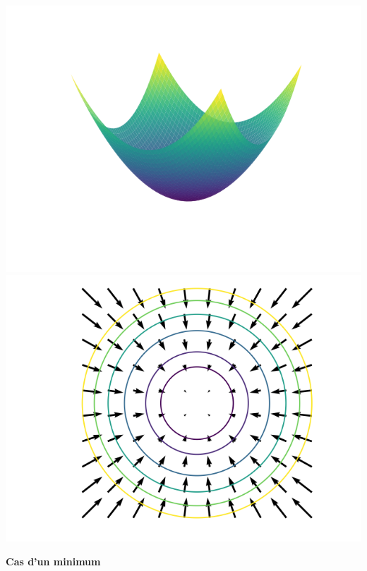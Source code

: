 \begin{center}
	\begin{minipage}{0.30\textwidth}
		\center
		\ \ \includegraphics[scale=\myscale,scale=0.35]{figures/gradient-surface-1b}\\
		
		\includegraphics[scale=\myscale,scale=0.35]{figures/gradient-surface-5a}
		
		\quad\textbf{Cas d'un minimum}
	\end{minipage}
	\begin{minipage}{0.30\textwidth}
		\center
		

\end{minipage}
\end{center}
